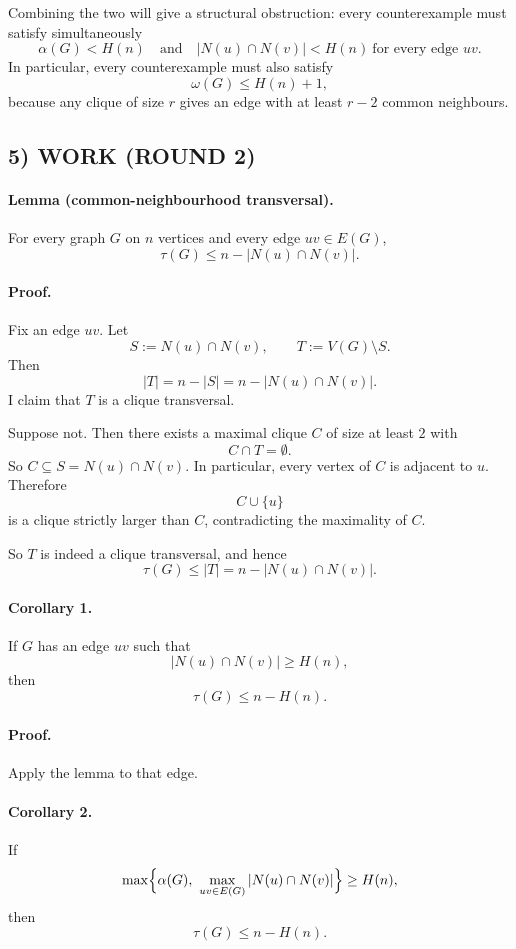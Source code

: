 Combining the two will give a structural obstruction:
every counterexample must satisfy simultaneously
\[
\alpha(G)<H(n)
\quad\mbox{and}\quad
|N(u)\cap N(v)|<H(n)\ \mbox{for every edge }uv.
\]
In particular, every counterexample must also satisfy
\[
\omega(G)\le H(n)+1,
\]
because any clique of size $r$ gives an edge with at least $r-2$ common neighbours.

\subsection*{5) WORK (ROUND 2)}

\paragraph{Lemma (common-neighbourhood transversal).}
For every graph $G$ on $n$ vertices and every edge $uv\in E(G)$,
\[
\tau(G)\le n-|N(u)\cap N(v)|.
\]

\paragraph{Proof.}
Fix an edge $uv$. Let
\[
S:=N(u)\cap N(v),
\qquad
T:=V(G)\setminus S.
\]
Then
\[
|T|=n-|S|=n-|N(u)\cap N(v)|.
\]
I claim that $T$ is a clique transversal.

Suppose not. Then there exists a maximal clique $C$ of size at least $2$ with
\[
C\cap T=\emptyset.
\]
So $C\subseteq S=N(u)\cap N(v)$. In particular, every vertex of $C$ is adjacent to $u$. Therefore
\[
C\cup\{u\}
\]
is a clique strictly larger than $C$, contradicting the maximality of $C$.

So $T$ is indeed a clique transversal, and hence
\[
\tau(G)\le |T|=n-|N(u)\cap N(v)|.
\]


\paragraph{Corollary 1.}
If $G$ has an edge $uv$ such that
\[
|N(u)\cap N(v)|\ge H(n),
\]
then
\[
\tau(G)\le n-H(n).
\]

\paragraph{Proof.}
Apply the lemma to that edge.


\paragraph{Corollary 2.}
If
\[
\max\Bigl\{\alpha(G),\ \max_{uv\in E(G)} |N(u)\cap N(v)|\Bigr\}\ge H(n),
\]
then
\[
\tau(G)\le n-H(n).
\]

